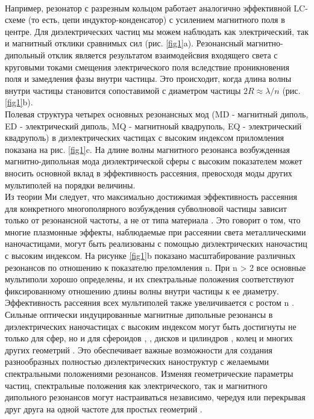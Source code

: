 \\
\hspace*{2mm}
Например, резонатор с разрезным кольцом \cite{pendry1999magnetism} работает аналогично эффективной LC-схеме (то есть, цепи индуктор-конденсатор) с усилением магнитного поля в центре. Для диэлектрических частиц мы можем наблюдать как электрический, так и магнитный отклики сравнимых сил (рис. \ref{fig1}a). Резонансный магнитно-дипольный отклик является результатом взаимодейсвия входящего света с круговыми токами смещения электрического поля вследствие проникновения поля и замедления фазы внутри частицы. Это происходит, когда длина волны внутри частицы становится сопоставимой с диаметром частицы $2R \approx \lambda/n$ (рис. \ref{fig1}b). 
\\
Полевая структура четырех основных резонансных мод (MD -  магнитный диполь, ED - электрический диполь, MQ - магнитноый квадруполь,  EQ - электрический квадруполь) в диэлектрических частицах с высоким индексом приломления показана на рис. \ref{fig1}c. На длине волны магнитного резонанса возбужденная магнитно-дипольная мода диэлектрической сферы с высоким показателем может вносить основной вклад в эффективность рассеяния, превосходя моды других мультиполей на порядки величины.
\\
\hspace*{2mm}
Из теории Ми следует, что максимально достижимая эффективность рассеяния для конкретного многополярного возбуждения субволновой частицы зависит только от резонансной частоты, а не от типа материала \cite{schuller2009general}. Это говорит о том, что многие плазмонные эффекты, наблюдаемые при рассеянии света металлическими наночастицами, могут быть реализованы с помощью диэлектрических наночастиц с высоким индексом. На рисунке \ref{fig1}b показано масштабирование различных резонансов по отношению к показателю преломления n. При n > 2 все основные мультиполи хорошо определены, и их спектральные положения соответствуют фиксированному отношению длины волны внутри частицы к ее диаметру. Эффективность рассеяния всех мультиполей также увеличивается с ростом n \cite{articleOptSi}.
\\
\hspace*{2mm}
Сильные оптически индуцированные магнитные дипольные резонансы в диэлектрических наночастицах с высоким индексом могут быть достигнуты не только для сфер, но и для сфероидов \cite{articleDirVi}, \cite{optScatShper}, дисков и цилиндров \cite{multLightScat}, колец \cite{contrMagnModes} и многих других геометрий \cite{nearInfrMR}. Это обеспечивает важные возможности для создания разнообразных полностью диэлектрических наноструктур с желаемыми спектральными положениями резонансов. Изменяя геометрические параметры частиц, спектральные положения как электрического, так и магнитного дипольного резонансов могут настраиваться независимо, чередуя или перекрывая друг друга на одной частоте для простых геометрий \cite{optScatDeilectrHightIndex}.


